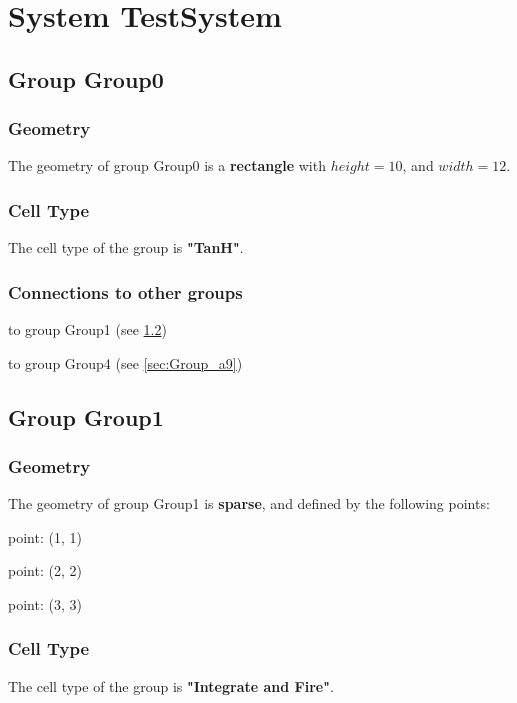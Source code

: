 \documentclass[a4paper, 11pt]{article}
\begin{document}
\section{System TestSystem}

\subsection{Group Group0}
\label{sec:Group_a1}

\subsubsection*{Geometry}

The geometry of group Group0 is a \textbf{rectangle} with
$height= 10$, and $width= 12$.

\subsubsection*{Cell Type}
The cell type of the group is \textbf{"TanH"}.

\subsubsection*{Connections to other groups}
\begin{compactenum}
\item to group Group1 (see \ref{sec:Group_a2})
\item to group Group4 (see \ref{sec:Group_a9})
\end{compactenum}

\subsection{Group Group1}
\label{sec:Group_a2}

\subsubsection*{Geometry}

The geometry of group Group1 is \textbf{sparse}, and defined
by the following points:
\begin{compactitem}
   \item point: (1, 1)
   \item point: (2, 2)
   \item point: (3, 3)
\end{compactitem}

\subsubsection*{Cell Type}
The cell type of the group is \textbf{"Integrate and Fire"}.
\end{document}
